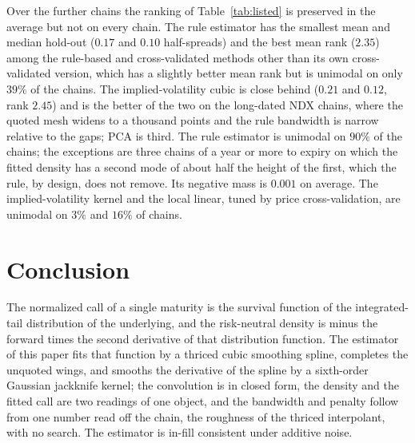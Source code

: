 \documentclass[preprint,12pt,authoryear,times]{elsarticle}
\begin{document}
Over the \nextra{} further chains the ranking of Table~\ref{tab:listed} is preserved in the average but not on every chain. The rule estimator has the smallest mean and median hold-out (\(0.17\) and \(0.10\) half-spreads) and the best mean rank (\(2.35\)) among the rule-based and cross-validated methods other than its own cross-validated version, which has a slightly better mean rank but is unimodal on only \(39\%\) of the chains. The implied-volatility cubic is close behind (\(0.21\) and \(0.12\), rank \(2.45\)) and is the better of the two on the long-dated NDX chains, where the quoted mesh widens to a thousand points and the rule bandwidth is narrow relative to the gaps; PCA is third. The rule estimator is unimodal on \(90\%\) of the chains; the exceptions are three chains of a year or more to expiry on which the fitted density has a second mode of about half the height of the first, which the rule, by design, does not remove. Its negative mass is \(0.001\) on average. The implied-volatility kernel and the local linear, tuned by price cross-validation, are unimodal on \(3\%\) and \(16\%\) of chains.

\section{Conclusion}
\label{sec:conc}

The normalized call of a single maturity is the survival function of the integrated-tail distribution of the underlying, and the risk-neutral density is minus the forward times the second derivative of that distribution function. The estimator of this paper fits that function by a thriced cubic smoothing spline, completes the unquoted wings, and smooths the derivative of the spline by a sixth-order Gaussian jackknife kernel; the convolution is in closed form, the density and the fitted call are two readings of one object, and the bandwidth and penalty follow from one number read off the chain, the roughness of the thriced interpolant, with no search. The estimator is in-fill consistent under additive noise.
\end{document}
